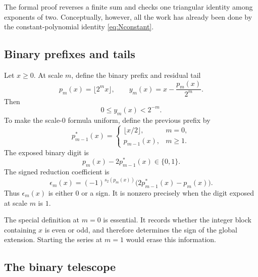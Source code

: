 \documentclass[11pt,oneside]{article}
\theoremstyle{definition}
\theoremstyle{remark}
\begin{document}
The formal proof reverses a finite sum and checks one triangular identity
among exponents of two.  Conceptually, however, all the work has already
been done by the constant-polynomial identity
\eqref{eq:Nconstant}.

\subsection{Binary prefixes and tails}

Let $x\ge0$.  At scale $m$, define the binary prefix and residual tail
\begin{equation}\label{eq:prefixTail}
 p_m(x)=\lfloor2^mx\rfloor,
 \qquad
 y_m(x)=x-\frac{p_m(x)}{2^m}.
\end{equation}
Then
\begin{equation}\label{eq:tailbounds}
 0\le y_m(x)<2^{-m}.
\end{equation}
To make the scale-$0$ formula uniform, define the previous prefix by
\begin{equation}\label{eq:previousPrefix}
 p_{m-1}^{*}(x)=
 \begin{cases}
  \lfloor x/2\rfloor,&m=0,\\
  p_{m-1}(x),&m\ge1.
 \end{cases}
\end{equation}
The exposed binary digit is
\[
 p_m(x)-2p_{m-1}^{*}(x)\in\{0,1\}.
\]
The signed reduction coefficient is
\begin{equation}\label{eq:epsilonm}
 \epsilon_m(x)=
 (-1)^{s_2(p_m(x))}
 \bigl(2p_{m-1}^{*}(x)-p_m(x)\bigr).
\end{equation}
Thus $\epsilon_m(x)$ is either $0$ or a sign.  It is nonzero precisely when
the digit exposed at scale $m$ is $1$.

The special definition at $m=0$ is essential.  It records whether the
integer block containing $x$ is even or odd, and therefore determines the
sign of the global extension.  Starting the series at $m=1$ would erase this
information.

\subsection{The binary telescope}
\end{document}
